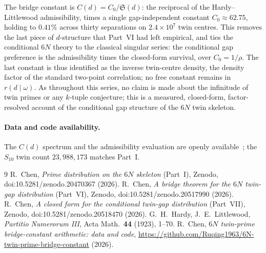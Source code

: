 \documentclass[11pt]{article}
\begin{document}
The bridge constant is $C(d)=C_0/\mathfrak{S}(d)$: the reciprocal of the
Hardy--Littlewood admissibility, times a single gap-independent constant
$C_0\approx62.75$, holding to $0.41\%$ across thirty separations on
$2.4\times10^{7}$ twin centres. This removes the last piece of $d$-structure
that Part~VI had left empirical, and ties the conditional $6N$ theory to the
classical singular series: the conditional gap preference is the admissibility
times the closed-form survival, over $C_0=1/\rho$. The last constant is thus
identified as the inverse twin-centre density, the density factor of the standard
two-point correlation; no free constant remains in $r(d\mid\omega)$. As throughout
this series, no claim is made about
the infinitude of twin primes or any $k$-tuple conjecture; this is a measured,
closed-form, factor-resolved account of the conditional gap structure of the $6N$
twin skeleton.

\paragraph{Data and code availability.}
The $C(d)$ spectrum and the admissibility evaluation are openly
available~\cite{repo}; the $S_{10}$ twin count $23{,}988{,}173$ matches Part~I.

\begin{thebibliography}{9}
 R.~Chen, \emph{Prime distribution on the $6N$ skeleton} (Part~I),
Zenodo, doi:10.5281/zenodo.20470367 (2026).
 R.~Chen, \emph{A bridge theorem for the $6N$ twin-gap
distribution} (Part~VI), Zenodo, doi:10.5281/zenodo.20517990 (2026).
 R.~Chen, \emph{A closed form for the conditional twin-gap
distribution} (Part~VII), Zenodo, doi:10.5281/zenodo.20518470 (2026).
 G.~H.~Hardy, J.~E.~Littlewood, \emph{Partitio Numerorum III}, Acta
Math.\ \textbf{44} (1923), 1--70.
 R.~Chen, \emph{$6N$ twin-prime bridge-constant arithmetic: data
and code}, \url{https://github.com/Ruqing1963/6N-twin-prime-bridge-constant} (2026).
\end{thebibliography}
\end{document}
